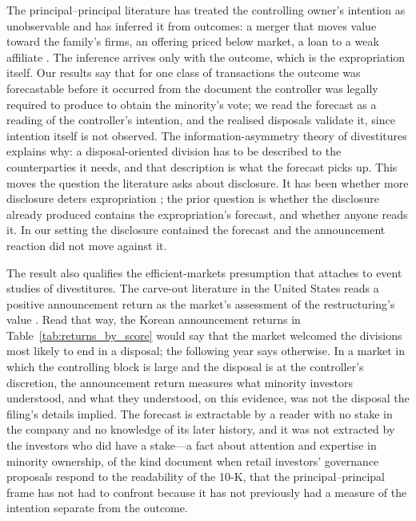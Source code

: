 The principal--principal literature has treated the controlling owner's intention as unobservable and has inferred it from outcomes: a merger that moves value toward the family's firms, an offering priced below market, a loan to a weak affiliate \cite{bertrand2002, bae2002, baek2006, buchuk2014}. The inference arrives only with the outcome, which is the expropriation itself. Our results say that for one class of transactions the outcome was forecastable before it occurred from the document the controller was legally required to produce to obtain the minority's vote; we read the forecast as a reading of the controller's intention, and the realised disposals validate it, since intention itself is not observed. The information-asymmetry theory of divestitures explains why: a disposal-oriented division has to be described to the counterparties it needs, and that description is what the forecast picks up. This moves the question the literature asks about disclosure. It has been whether more disclosure deters expropriation \cite{he2025}; the prior question is whether the disclosure already produced contains the expropriation's forecast, and whether anyone reads it. In our setting the disclosure contained the forecast and the announcement reaction did not move against it.

The result also qualifies the efficient-markets presumption that attaches to event studies of divestitures. The carve-out literature in the United States reads a positive announcement return as the market's assessment of the restructuring's value \cite{schipper1986, nanda1991, slovin1995, hulburt2002}. Read that way, the Korean announcement returns in Table~\ref{tab:returns_by_score} would say that the market welcomed the divisions most likely to end in a disposal; the following year says otherwise. In a market in which the controlling block is large and the disposal is at the controller's discretion, the announcement return measures what minority investors understood, and what they understood, on this evidence, was not the disposal the filing's details implied. The forecast is extractable by a reader with no stake in the company and no knowledge of its later history, and it was not extracted by the investors who did have a stake---a fact about attention and expertise in minority ownership, of the kind  document when retail investors' governance proposals respond to the readability of the 10-K, that the principal--principal frame has not had to confront because it has not previously had a measure of the intention separate from the outcome.

